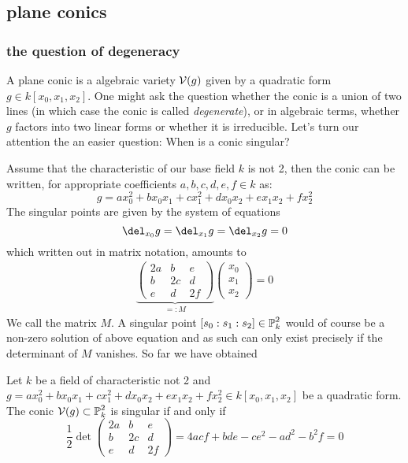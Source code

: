 \subsection{plane conics}

\subsubsection{the question of degeneracy}

A plane conic is a algebraic variety $\operatorname{\mathcal V}(g)$ given by a quadratic form $g \in k[x_0,x_1,x_2]$. One might ask the question whether the conic is a union of two lines (in which case the conic is called \emph{degenerate}), or in algebraic terms, whether $g$ factors into two linear forms or whether it is irreducible.
Let's turn our attention the an easier question: When is a conic singular?

Assume that the characteristic of our base field $k$ is not 2, then the conic can be written, for appropriate coefficients $a,b,c,d,e,f \in k$ as:
\begin{equation}
g = ax_0^2 + bx_0x_1 + cx_1^2 + dx_0x_2 + ex_1x_2 + fx_2^2
\end{equation}
The singular points are given by the system of equations
\begin{equation}
\del_{x_0} g = \del_{x_1} g = \del_{x_2} g = 0
\end{equation}
which written out in matrix notation, amounts to
\begin{align}
\underset{=:M}{\underbrace{
\begin{pmatrix}
2a & b & e \\
b & 2c & d \\
e & d & 2f
\end{pmatrix}
}}
\begin{pmatrix}
x_0 \\ x_1 \\ x_2
\end{pmatrix}
= 0
\end{align}
We call the matrix $M$.
A singular point $[s_0:s_1:s_2] \in \operatorname{\mathbb P}^2_k$ would of course be a non-zero solution of above equation and as such can only exist precisely if the determinant of $M$ vanishes.
So far we have obtained

\begin{corollary}
Let $k$ be a field of characteristic not 2 and $g =  ax_0^2 + bx_0x_1 + cx_1^2 + dx_0x_2 + ex_1x_2 + fx_2^2
\in k[x_0,x_1,x_2]$ be a quadratic form. The conic $\operatorname{\mathcal V}(g) \subset \operatorname{\mathbb P}^2_k$ is singular if and only if
\begin{equation}
\frac 12
\det
\begin{pmatrix}
2a & b & e \\
b & 2c & d \\
e & d & 2f
\end{pmatrix}
= 4acf + bde - ce^2 - ad^2 - b^2f = 0
\end{equation}
\end{corollary}

